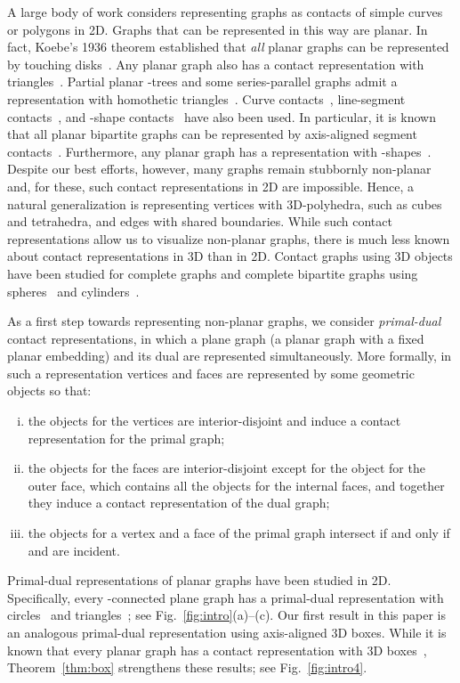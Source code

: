 \documentclass{article}
\newcommand{\df}{\textit}
\begin{document}
A large body of work considers representing graphs as contacts of
simple curves or polygons in 2D.
Graphs that can be represented in this way are planar.
In fact, Koebe's 1936 theorem established that \emph{all} planar
graphs can be represented by touching disks~\cite{Koe36}.
Any planar graph also has a contact representation with
triangles~\cite{FMR94,GLP12}. Partial planar -trees and some
series-parallel graphs admit a representation with homothetic
triangles~\cite{BBGDF+07}. Curve contacts~\cite{Hli98}, line-segment
contacts~\cite{FM07a,KM94}, and -shape contacts~\cite{CKU13,KUV13}
have also been used.
In particular, it is known that all planar bipartite graphs can be represented by axis-aligned
segment contacts~\cite{CKU98,FMP91,RT86}.
Furthermore, any planar graph has a representation with -shapes~\cite{FMR94}.
Despite our best efforts, however, many graphs remain stubbornly
non-planar and, for these, such contact representations in 2D are impossible.
Hence, a natural generalization is representing vertices with 3D-polyhedra, such
as cubes and tetrahedra, and edges with shared boundaries. While such contact
representations allow us to visualize non-planar graphs, there is much less known
about contact representations in 3D than in 2D. Contact graphs using 3D objects
have been studied for complete graphs and complete bipartite graphs
using spheres~\cite{BR13,HK01} and cylinders~\cite{Bez05}.


As a first step towards representing non-planar graphs, we consider
\df{primal-dual} contact representations, in which a plane graph (a planar graph with a fixed planar embedding)
and its dual are represented simultaneously. More formally, in such a representation
vertices and faces are represented by some geometric objects so that:

\begin{enumerate}[(i)]
	\item the objects for the vertices are interior-disjoint and induce a contact representation
		for the primal graph;
	\item the objects for the faces are interior-disjoint except for the object for the outer
		face, which contains all the objects for the internal faces, and together they induce a
		contact representation of the dual graph;
	\item the objects for a vertex  and a face  of the primal graph intersect if and only
		if  and  are incident.
\end{enumerate}

Primal-dual representations of planar graphs have been studied in 2D. Specifically,
every -connected plane graph has a primal-dual representation with circles~\cite{And70} and
triangles~\cite{GLP12}; see Fig.~\ref{fig:intro}(a)--(c). Our first result in this paper
is an analogous primal-dual representation using axis-aligned 3D boxes. While it is known that every planar graph has a contact representation with
3D boxes~\cite{Tho88,FF11,BEFHK+12},
 Theorem~\ref{thm:box} strengthens these results; see Fig.~\ref{fig:intro4}.
\end{document}
